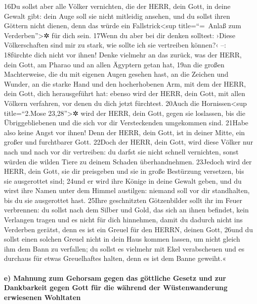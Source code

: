 16Du sollst aber alle Völker vernichten, die der HERR, dein Gott, in
deine Gewalt gibt: dein Auge soll sie nicht mitleidig ansehen, und du
sollst ihren Göttern nicht dienen, denn das würde ein
Fallstrick\textless sup title=``=~Anlaß zum Verderben''\textgreater✲ für
dich sein. 17Wenn du aber bei dir denken solltest: ›Diese Völkerschaften
sind mir zu stark, wie sollte ich sie vertreiben können?‹ --: 18fürchte
dich nicht vor ihnen! Denke vielmehr an das zurück, was der HERR, dein
Gott, am Pharao und an allen Ägyptern getan hat, 19an die großen
Machterweise, die du mit eigenen Augen gesehen hast, an die Zeichen und
Wunder, an die starke Hand und den hocherhobenen Arm, mit dem der HERR,
dein Gott, dich herausgeführt hat: ebenso wird der HERR, dein Gott, mit
allen Völkern verfahren, vor denen du dich jetzt fürchtest. 20Auch die
Hornissen\textless sup title=``2.Mose 23,28''\textgreater✲ wird der
HERR, dein Gott, gegen sie loslassen, bis die Übriggebliebenen und die
sich vor dir Versteckenden umgekommen sind. 21Habe also keine Angst vor
ihnen! Denn der HERR, dein Gott, ist in deiner Mitte, ein großer und
furchtbarer Gott. 22Doch der HERR, dein Gott, wird diese Völker nur nach
und nach vor dir vertreiben: du darfst sie nicht schnell vernichten,
sonst würden die wilden Tiere zu deinem Schaden überhandnehmen. 23Jedoch
wird der HERR, dein Gott, sie dir preisgeben und sie in große Bestürzung
versetzen, bis sie ausgerottet sind; 24und er wird ihre Könige in deine
Gewalt geben, und du wirst ihre Namen unter dem Himmel austilgen:
niemand soll vor dir standhalten, bis du sie ausgerottet hast. 25Ihre
geschnitzten Götzenbilder sollt ihr im Feuer verbrennen: du sollst nach
dem Silber und Gold, das sich an ihnen befindet, kein Verlangen tragen
und es nicht für dich hinnehmen, damit du dadurch nicht ins Verderben
gerätst, denn es ist ein Greuel für den HERRN, deinen Gott, 26und du
sollst einen solchen Greuel nicht in dein Haus kommen lassen, um nicht
gleich ihm dem Bann zu verfallen; du sollst es vielmehr mit Ekel
verabscheuen und es durchaus für etwas Greuelhaftes halten, denn es ist
dem Banne geweiht.«

\hypertarget{e-mahnung-zum-gehorsam-gegen-das-guxf6ttliche-gesetz-und-zur-dankbarkeit-gegen-gott-fuxfcr-die-wuxe4hrend-der-wuxfcstenwanderung-erwiesenen-wohltaten}{%
\paragraph{e) Mahnung zum Gehorsam gegen das göttliche Gesetz und zur
Dankbarkeit gegen Gott für die während der Wüstenwanderung erwiesenen
Wohltaten}\label{e-mahnung-zum-gehorsam-gegen-das-guxf6ttliche-gesetz-und-zur-dankbarkeit-gegen-gott-fuxfcr-die-wuxe4hrend-der-wuxfcstenwanderung-erwiesenen-wohltaten}}

